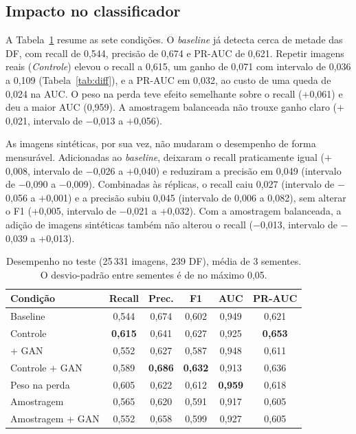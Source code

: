 \documentclass[conference]{IEEEtran}
\newcommand{\pl}{\ensuremath{+}}
\newcommand{\mn}{\ensuremath{-}}
\begin{document}
\subsection{Impacto no classificador}
A Tabela~\ref{tab:clf} resume as sete condições. O \textit{baseline} já detecta cerca de metade das DF, com recall de 0,544, precisão de 0,674 e PR-AUC de 0,621. Repetir imagens reais (\textit{Controle}) elevou o recall a 0,615, um ganho de 0,071 com intervalo de 0,036 a 0,109 (Tabela~\ref{tab:diff}), e a PR-AUC em 0,032, ao custo de uma queda de 0,024 na AUC. O peso na perda teve efeito semelhante sobre o recall (\pl0,061) e deu a maior AUC (0,959). A amostragem balanceada não trouxe ganho claro (\pl0,021, intervalo de \mn0,013 a \pl0,056).

As imagens sintéticas, por sua vez, não mudaram o desempenho de forma mensurável. Adicionadas ao \textit{baseline}, deixaram o recall praticamente igual (\pl0,008, intervalo de \mn0,026 a \pl0,040) e reduziram a precisão em 0,049 (intervalo de \mn0,090 a \mn0,009). Combinadas às réplicas, o recall caiu 0,027 (intervalo de \mn0,056 a \pl0,001) e a precisão subiu 0,045 (intervalo de 0,006 a 0,082), sem alterar o F1 (\pl0,005, intervalo de \mn0,021 a \pl0,032). Com a amostragem balanceada, a adição de imagens sintéticas também não alterou o recall (\mn0,013, intervalo de \mn0,039 a \pl0,013).

\begin{table}[ht]
\centering
\caption{Desempenho no teste (25\,331 imagens, 239 DF), média de 3 sementes. O desvio-padrão entre sementes é de no máximo 0,05.}
\label{tab:clf}
\scriptsize
\setlength{\tabcolsep}{3pt}
\begin{tabular}{lccccc}
\toprule
\textbf{Condição} & \textbf{Recall} & \textbf{Prec.} & \textbf{F1} & \textbf{AUC} & \textbf{PR-AUC} \\
\midrule
Baseline & 0,544 & 0,674 & 0,602 & 0,949 & 0,621 \\
Controle & \textbf{0,615} & 0,641 & 0,627 & 0,925 & \textbf{0,653} \\
+ GAN & 0,552 & 0,627 & 0,587 & 0,948 & 0,611 \\
Controle + GAN & 0,589 & \textbf{0,686} & \textbf{0,632} & 0,913 & 0,636 \\
Peso na perda & 0,605 & 0,622 & 0,612 & \textbf{0,959} & 0,618 \\
Amostragem & 0,565 & 0,620 & 0,591 & 0,917 & 0,605 \\
Amostragem + GAN & 0,552 & 0,658 & 0,599 & 0,927 & 0,605 \\
\bottomrule
\end{tabular}
\end{table}
\end{document}

